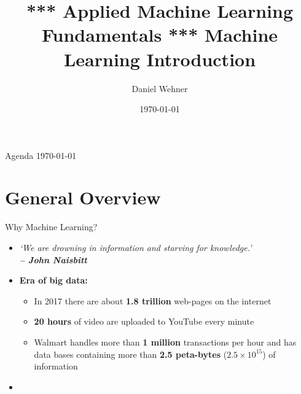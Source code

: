 


\title[Machine Learning Introduction]{*** Applied Machine Learning Fundamentals *** Machine Learning Introduction}
\author{Daniel Wehner}
\date{\today}




\maketitlepage


\begin{frame}{Agenda \today}
	\begin{multicols}{2}
		\tableofcontents
	\end{multicols}
\end{frame}


\section{General Overview}

\begin{frame}{Why Machine Learning?}{}
	\begin{itemize}
		\item \textit{`We are drowning in information and starving for knowledge.' \\
			\hfill\textbf{-- John Naisbitt}}
		\item \textbf{Era of big data:}
		\begin{itemize}
			\item In 2017 there are about \textbf{1.8 trillion} web-pages on the internet
			\item \textbf{20 hours} of video are uploaded to YouTube every minute
			\item Walmart handles more than \textbf{1 million} transactions per hour and has data bases containing more 
				than \textbf{2.5 peta-bytes} ($2.5 \times 10^15$) of information
		\end{itemize}
		\item {}
	\end{itemize}
\end{frame}


